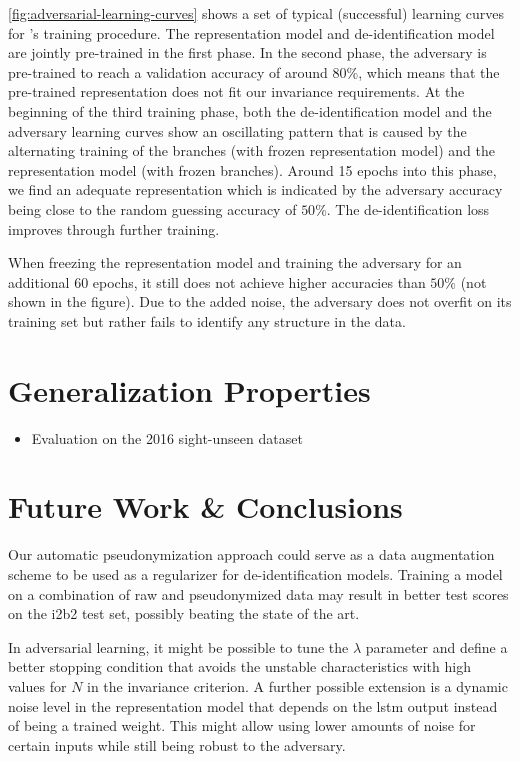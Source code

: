 \begin{description}
    \cref{fig:adversarial-learning-curves} shows a set of typical (successful) learning curves for \citeauthor{feutry2018learning}'s training procedure.
    The representation model and de-identification model are jointly pre-trained in the first phase.
    In the second phase, the adversary is pre-trained to reach a validation accuracy of around $80\%$, which means that the pre-trained representation does not fit our invariance requirements.
    At the beginning of the third training phase, both the de-identification model and the adversary learning curves show an oscillating pattern that is caused by the alternating training of the branches (with frozen representation model) and the representation model (with frozen branches).
    Around 15 epochs into this phase, we find an adequate representation which is indicated by the adversary accuracy being close to the random guessing accuracy of $50\%$.
    The de-identification loss improves through further training.

    When freezing the representation model and training the adversary for an additional $60$ epochs, it still does not achieve higher accuracies than $50\%$ (not shown in the figure).
    Due to the added noise, the adversary does not overfit on its training set but rather fails to identify any structure in the data.    
\end{description}

\section{Generalization Properties}

\begin{itemize}
    \item Evaluation on the 2016 sight-unseen dataset
\end{itemize}

\section{Future Work \& Conclusions}
%
Our automatic pseudonymization approach could serve as a data augmentation scheme to be used as a regularizer for de-identification models.
%
Training a model on a combination of raw and pseudonymized data may result in better test scores on the i2b2 test set, possibly beating the state of the art.

%
In adversarial learning, it might be possible to tune the $\lambda$ parameter and define a better stopping condition that avoids the unstable characteristics with high values for $N$ in the invariance criterion.
%
A further possible extension is a dynamic noise level in the representation model that depends on the \ac{lstm} output instead of being a trained weight.
%
This might allow using lower amounts of noise for certain inputs while still being robust to the adversary.

